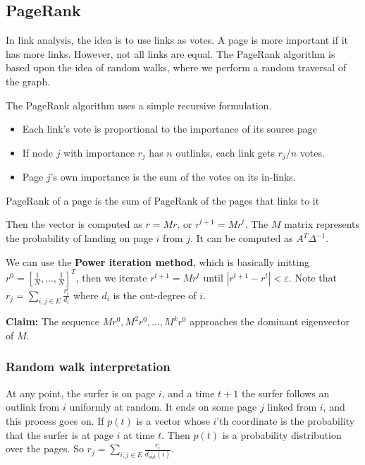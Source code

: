 \subsection{PageRank}
    In link analysis, the idea is to use links as votes. A page is more important if it has more links. However, not all links are equal. The PageRank algorithm is based upon the idea of random walks, where we perform a random traversal of the graph. 
    
    The PageRank algorithm uses a simple recursive formulation. 
    \begin{itemize}
        \item Each link's vote is proportional to the importance of its source page
        \item If node $j$ with importance $r_j$ has $n$ outlinks, each link gets $r_j/n$ votes. 
        \item Page $j$'s own importance is the sum of the votes on its in-links.
    \end{itemize}
    
    \begin{defi}
        PageRank of a page is the sum of PageRank of the pages that links to it
    \end{defi}
    Then the vector is computed as $r = Mr$, or $r^{t+1} = Mr^t$. The $M$ matrix represents the probability of landing on page $i$ from $j$. It can be computed as $A^T \Delta^{-1}$. 
    
    We can use the \textbf{Power iteration method}, which is basically initting $r^{0} = [\frac{1}{N}, \dots, \frac{1}{N}]
    ^T$, then we iterate $r^{t+1} = Mr^t$ until $|r^{t+1} - r^t| < \varepsilon$. Note that $r_j = \sum_{i, j \in E}{\frac{r_i^t}{d_i}}$ where $d_i$ is the out-degree of $i$.
    
    \textbf{Claim:} The sequence $Mr^0, M^2r^0, \dots, M^k r^0$ approaches the dominant eigenvector of $M$. 
    
   \subsubsection{Random walk interpretation}
        At any point, the surfer is on page $i$, and a time $t+1$ the surfer follows an outlink from $i$ uniformly at random. It ends on some page $j$ linked from $i$, and this process goes on. If $p(t)$ is a vector whose $i$'th coordinate is the probability that the surfer is at page $i$ at time $t$. Then $p(t)$ is a probability distribution over the pages. So $r_j = \sum_{i, j \in E}{\frac{r_i}{d_{out}(i)}}$.
        
